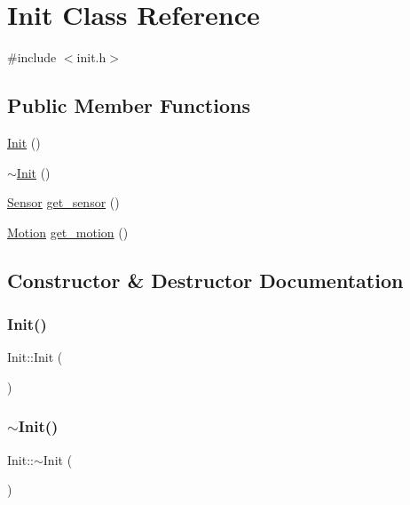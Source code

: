 \hypertarget{class_init}{}\section{Init Class Reference}
\label{class_init}


{\ttfamily \#include $<$init.\+h$>$}

\subsection*{Public Member Functions}
\begin{DoxyCompactItemize}
\item 
\mbox{\hyperlink{class_init_a06a43f2bcb930e7ebec7d383efc15fd9}{Init}} ()
\item 
\mbox{\hyperlink{class_init_a67d5c94cb965fa3b774e969cfb4969d1}{$\sim$\+Init}} ()
\item 
\mbox{\hyperlink{class_sensor}{Sensor}} \mbox{\hyperlink{class_init_a8d5597fb9e9bfb192a235cdee32ede2d}{get\+\_\+sensor}} ()
\item 
\mbox{\hyperlink{class_motion}{Motion}} \mbox{\hyperlink{class_init_a2f0137392b84da9c02d9c4d892e44534}{get\+\_\+motion}} ()
\end{DoxyCompactItemize}


\subsection{Constructor \& Destructor Documentation}
\mbox{\label{class_init_a06a43f2bcb930e7ebec7d383efc15fd9}} 
\subsubsection{\texorpdfstring{Init()}{Init()}}
{\footnotesize\ttfamily Init\+::\+Init (\begin{DoxyParamCaption}{ }\end{DoxyParamCaption})}

\mbox{\label{class_init_a67d5c94cb965fa3b774e969cfb4969d1}} 
\subsubsection{\texorpdfstring{$\sim$\+Init()}{~Init()}}
{\footnotesize\ttfamily Init\+::$\sim$\+Init (\begin{DoxyParamCaption}{ }\end{DoxyParamCaption})}



